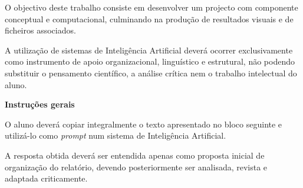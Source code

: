 \documentclass[12pt,a4paper,twoside]{report}
\begin{document}

\cleardoublepage


\begin{abstract}
Este espaço destina-se a um resumo breve do trabalho, a redigir no final.
Indicar o objectivo do projecto, a metodologia geral seguida e os principais
resultados obtidos (sem detalhes técnicos).
Manter entre 3 e 6 linhas.
Substituir este texto após concluir integralmente o relatório.
\end{abstract}
\cleardoublepage


\tableofcontents
\cleardoublepage


O objectivo deste trabalho consiste em desenvolver um projecto com
componente conceptual e computacional, culminando na produção de
resultados visuais e de ficheiros associados.

A utilização de sistemas de Inteligência Artificial deverá ocorrer
exclusivamente como instrumento de apoio organizacional, linguístico
e estrutural, não podendo substituir o pensamento científico,
a análise crítica nem o trabalho intelectual do aluno.

\vspace{0.5cm}

\textbf{Instruções gerais}

O aluno deverá copiar integralmente o texto apresentado no bloco seguinte
e utilizá-lo como \emph{prompt} num sistema de Inteligência Artificial.

A resposta obtida deverá ser entendida apenas como proposta inicial de
organização do relatório, devendo posteriormente ser analisada,
revista e adaptada criticamente.

\vspace{0.5cm}

\end{document}
